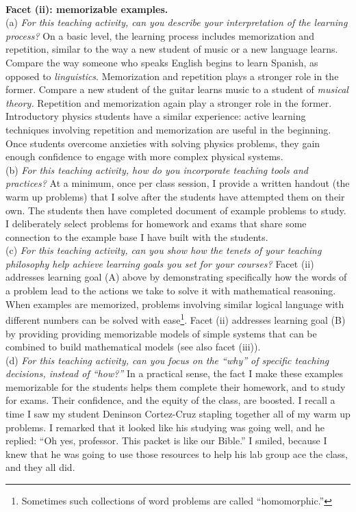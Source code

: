 \documentclass[../../../main.tex]{subfiles}
\begin{document}
\\
\vspace{0.25cm}
\textbf{Facet (ii): memorizable examples.}
\\
\vspace{0.25cm}
(a) \textit{For this teaching activity, can you describe your interpretation of the learning process?} On a basic level, the learning process includes memorization and repetition, similar to the way a new student of music or a new language learns.  Compare the way someone who speaks English begins to learn Spanish, as opposed to \textit{linguistics}.  Memorization and repetition plays a stronger role in the former.  Compare a new student of the guitar learns music to a student of \textit{musical theory.}  Repetition and memorization again play a stronger role in the former.  Introductory physics students have a similar experience: active learning techniques involving repetition and memorization are useful in the beginning.  Once students overcome anxieties with solving physics problems, they gain enough confidence to engage with more complex physical systems.
\\
\vspace{0.25cm}
(b) \textit{For this teaching activity, how do you incorporate teaching tools and practices?}  At a minimum, once per class session, I provide a written handout (the warm up problems) that I solve after the students have attempted them on their own.  The students then have completed document of example problems to study.  I deliberately select problems for homework and exams that share some connection to the example base I have built with the students.
\\
\vspace{0.25cm}
(c) \textit{For this teaching activity, can you show how the tenets of your teaching philosophy help achieve learning goals you set for your courses?}  Facet (ii) addresses learning goal (A) above by demonstrating specifically how the words of a problem lead to the actions we take to solve it with mathematical reasoning.  When examples are memorized, problems involving similar logical language with different numbers can be solved with ease\footnote{Sometimes such collections of word problems are called ``homomorphic.''}.  Facet (ii) addresses learning goal (B) by providing providing memorizable models of simple systems that can be combined to build mathematical models (see also facet (iii)).
\\
\vspace{0.25cm}
(d) \textit{For this teaching activity, can you focus on the ``why'' of specific teaching decisions, instead of ``how?''} In a practical sense, the fact I make these examples memorizable for the students helps them complete their homework, and to study for exams.  Their confidence, and the equity of the class, are boosted.  I recall a time I saw my student Deninson Cortez-Cruz stapling together all of my warm up problems.  I remarked that it looked like his studying was going well, and he replied: ``Oh yes, professor.  This packet is like our Bible.''  I smiled, because I knew that he was going to use those resources to help his lab group ace the class, and they all did.
\end{document}
